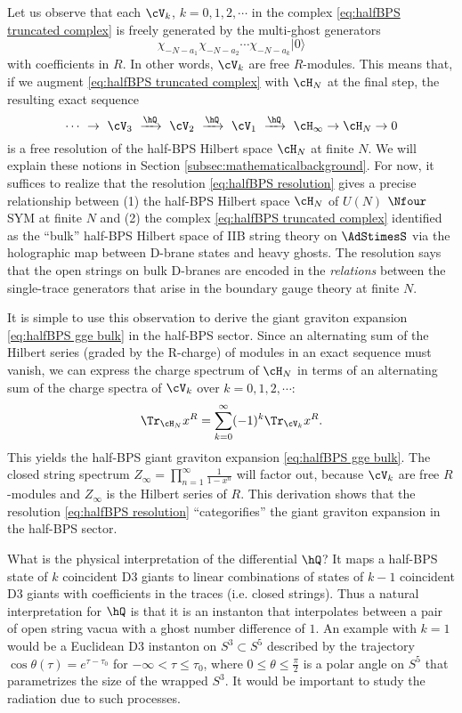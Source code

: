 \documentclass[a4paper,12pt]{article}
\begin{document}
Let us observe that each $\cV_k$, $k=0,1,2, \cdots$ in the complex \eqref{eq:halfBPS truncated complex} is freely generated by the multi-ghost generators
\begin{equation}
\chi_{-N-a_1} \chi_{-N-a_2} \cdots \chi_{-N-a_k} |0\rangle
\end{equation}
with coefficients in $R$. In other words, $\cV_k$ are free $R$-modules. This means that, if we augment \eqref{eq:halfBPS truncated complex} with $\cH_N$ at the final step, the resulting exact sequence
\begin{equation} \label{eq:halfBPS resolution}
\cdots \ \rightarrow \ \cV_3 \ \xrightarrow{\hQ} \ \cV_2 \ \xrightarrow{\hQ} \ \cV_1 \ \xrightarrow{\hQ} \ \cH_\infty \rightarrow \cH_N \rightarrow 0
\end{equation}
is a free resolution of the half-BPS Hilbert space $\cH_N$ at finite $N$. We will explain these notions in Section \ref{subsec:mathematicalbackground}. For now, it suffices to realize that the resolution \eqref{eq:halfBPS resolution} gives a precise relationship between (1) the half-BPS Hilbert space $\cH_N$ of $U(N)$ $\Nfour$ SYM at finite $N$ and (2) the complex \eqref{eq:halfBPS truncated complex} identified as the ``bulk'' half-BPS Hilbert space of IIB string theory on $\AdStimesS$ via the holographic map between D-brane states and heavy ghosts. The resolution says that the open strings on bulk D-branes are encoded in the \textit{relations} between the single-trace generators that arise in the boundary gauge theory at finite $N$.

It is simple to use this observation to derive the giant graviton expansion \eqref{eq:halfBPS gge bulk} in the half-BPS sector. Since an alternating sum of the Hilbert series (graded by the R-charge) of modules in an exact sequence must vanish, we can express the charge spectrum of $\cH_N$ in terms of an alternating sum of the charge spectra of $\cV_k$ over $k=0,1,2, \cdots$:
\begin{equation}
\Tr_{\cH_N} x^R = \sum_{k=0}^\infty (-1)^k \Tr_{\cV_k} x^R.
\end{equation}
This yields the half-BPS giant graviton expansion \eqref{eq:halfBPS gge bulk}. The closed string spectrum $Z_\infty = \prod_{n=1}^\infty \frac{1}{1-x^n}$ will factor out, because $\cV_k$ are free $R$-modules and $Z_\infty$ is the Hilbert series of $R$. This derivation shows that the resolution \eqref{eq:halfBPS resolution} ``categorifies'' the giant graviton expansion in the half-BPS sector.

What is the physical interpretation of the differential $\hQ$? It maps a half-BPS state of $k$ coincident D3 giants to linear combinations of states of $k-1$ coincident D3 giants with coefficients in the traces (i.e. closed strings). Thus a natural interpretation for $\hQ$ is that it is an instanton that interpolates between a pair of open string vacua with a ghost number difference of $1$. An example with $k=1$ would be a Euclidean D3 instanton on $S^3 \subset S^5$ described by the trajectory $\cos \theta(\tau) = e^{\tau - \tau_0}$ for $-\infty < \tau \leq \tau_0$, where $0 \leq \theta \leq \frac{\pi}{2}$ is a polar angle on $S^5$ that parametrizes the size of the wrapped $S^3$. It would be important to study the radiation due to such processes.
\end{document}
